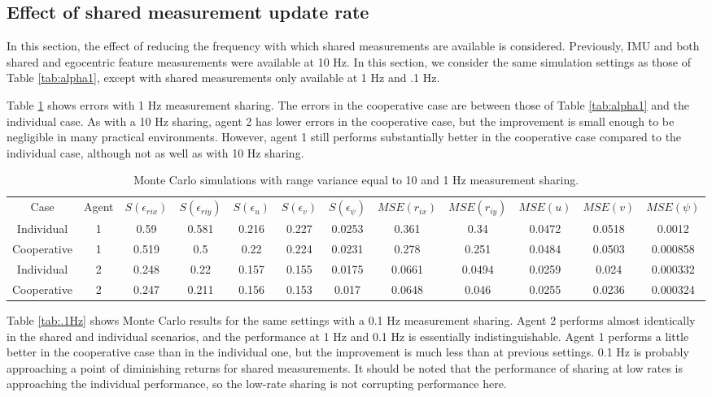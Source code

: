 \documentclass{aiaa-tc}
\begin{document}
\subsection{Effect of shared measurement update rate}

In this section, the effect of reducing the frequency with which shared measurements are available is considered. Previously, IMU and both shared and egocentric feature measurements were available at 10 Hz. In this section, we consider the same simulation settings as those of Table \ref{tab:alpha1}, except with shared measurements only available at 1 Hz and .1 Hz.

Table \ref{tab:1Hz} shows errors with 1 Hz measurement sharing. The errors in the cooperative case are between those of Table \ref{tab:alpha1} and the individual case. As with a 10 Hz sharing, agent 2 has lower errors in the cooperative case, but the improvement is small enough to be negligible in many practical environments. However, agent 1 still performs substantially better in the cooperative case compared to the individual case, although not as well as with 10 Hz sharing.

\begin{table}[tb!]
\scriptsize
\centering
\begin{tabular}{c|c|c|c|c|c|c|c|c|c|c|c|}
Case & Agent & $S(\epsilon_{rix})$ & $S(\epsilon_{riy})$ & $S(\epsilon_{u})$ & $S(\epsilon_{v})$ & $S(\epsilon_{\psi})$ & $MSE(r_{ix})$ & $MSE(r_{iy})$ & $MSE(u)$ & $MSE(v)$ & $MSE(\psi)$ \\
Individual & 1& 0.59& 0.581& 0.216& 0.227& 0.0253& 0.361& 0.34& 0.0472& 0.0518& 0.0012 \\
Cooperative & 1& 0.519& 0.5& 0.22& 0.224& 0.0231& 0.278& 0.251& 0.0484& 0.0503& 0.000858 \\
Individual & 2& 0.248& 0.22& 0.157& 0.155& 0.0175& 0.0661& 0.0494& 0.0259& 0.024& 0.000332 \\
Cooperative & 2& 0.247& 0.211& 0.156& 0.153& 0.017& 0.0648& 0.046& 0.0255& 0.0236& 0.000324 \\
\end{tabular}
\caption{Monte Carlo simulations with range variance equal to 10 and 1 Hz measurement sharing.}
\label{tab:1Hz}
\end{table}

Table \ref{tab:.1Hz} shows Monte Carlo results for the same settings with a 0.1 Hz measurement sharing. Agent 2 performs almost identically in the shared and individual scenarios, and the performance at 1 Hz and 0.1 Hz is essentially indistinguishable. Agent 1 performs a little better in the cooperative case than in the individual one, but the improvement is much less than at previous settings. 0.1 Hz is probably approaching a point of diminishing returns for shared measurements. It should be noted that the performance of sharing at low rates is approaching the individual performance, so the low-rate sharing is not corrupting performance here. 
\end{document}
